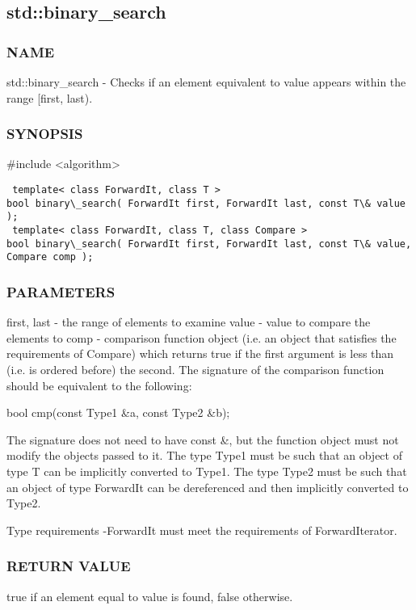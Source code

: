 \subsection{std::binary\_search}

\subsubsection{NAME}
std::binary\_search - Checks if an element equivalent to value appears within the range [first, last).

\subsubsection{SYNOPSIS}
\#include <algorithm>

\begin{lstlisting}
 template< class ForwardIt, class T >
bool binary\_search( ForwardIt first, ForwardIt last, const T\& value );
 template< class ForwardIt, class T, class Compare >
bool binary\_search( ForwardIt first, ForwardIt last, const T\& value, Compare comp );
\end{lstlisting}

\subsubsection{PARAMETERS}
first, last - the range of elements to examine
value - value to compare the elements to
comp - comparison function object (i.e. an object that satisfies the requirements of Compare) which returns true if the first argument is less than (i.e. is ordered before) the second.
The signature of the comparison function should be equivalent to the following:

 bool cmp(const Type1 \&a, const Type2 \&b);

The signature does not need to have const \&, but the function object must not modify the objects passed to it.
The type Type1 must be such that an object of type T can be implicitly converted to Type1. The type Type2 must be such that an object of type ForwardIt can be dereferenced and then implicitly converted to Type2.

 Type requirements
 -ForwardIt must meet the requirements of ForwardIterator.

\subsubsection{RETURN VALUE}
true if an element equal to value is found, false otherwise.



